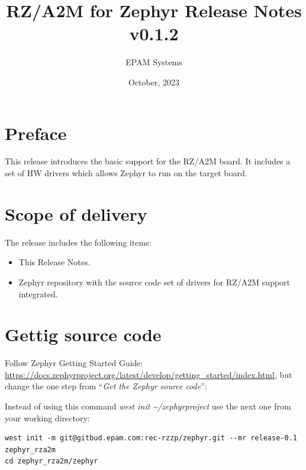 \documentclass[11pt,a4paper,oneside]{article}
\begin{document}

\setcounter{secnumdepth}{4}
\setcounter{tocdepth}{4}

\title{RZ/A2M for Zephyr Release Notes v0.1.2}
\author{EPAM Systems}
\date{October, 2023}

\maketitle

\tableofcontents

\clearpage

\section{Preface}\label{preface}

This release introduces the basic support for the RZ/A2M board. It
includes a set of HW drivers which allows Zephyr to run on the target
board.

\section{Scope of delivery}\label{scope-of-delivery}

The release includes the following items:

\begin{itemize}
\item This Release Notes.
\item Zephyr repository with the source code set of drivers for RZ/A2M support integrated.
\end{itemize}

\section{Gettig source code}\label{gettig-source-code}

Follow Zephyr Getting Started Guide:
\url{https://docs.zephyrproject.org/latest/develop/getting_started/index.html},
but change the one step from ``\emph{Get the Zephyr source code}'':

Instead of using this command \emph{west init
\textasciitilde/zephyrproject} use the next one from your working
directory:

\begin{lstlisting}
west init -m git@gitbud.epam.com:rec-rzzp/zephyr.git --mr release-0.1 zephyr_rza2m
cd zephyr_rza2m/zephyr
\end{lstlisting}
\end{document}

